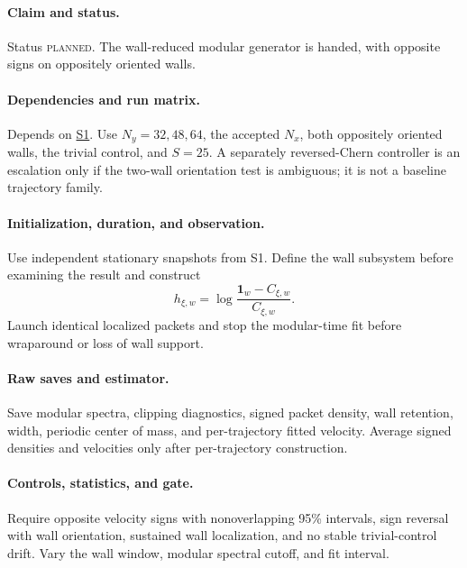 \documentclass[aps,prx,twocolumn,floatfix,nofootinbib,superscriptaddress,longbibliography]{revtex4-2}
\newcommand{\planned}{\textsc{planned}}
\newcommand{\campref}[1]{\hyperref[camp:#1]{#1}}
\begin{document}
\paragraph*{Claim and status.}
Status \planned.  The wall-reduced modular generator is handed, with opposite signs on
oppositely oriented walls.

\paragraph*{Dependencies and run matrix.}
Depends on \campref{S1}.  Use $N_y=32,48,64$, the accepted $N_x$, both oppositely oriented walls,
the trivial control, and $S=25$.  A separately reversed-Chern controller is an escalation
only if the two-wall
orientation test is ambiguous; it is not a baseline trajectory family.

\paragraph*{Initialization, duration, and observation.}
Use independent stationary snapshots from S1.  Define the wall subsystem before examining
the result and construct
\begin{equation}
 h_{\xi,w}=\log\frac{\mathbf{1}_w-C_{\xi,w}}{C_{\xi,w}}.
\end{equation}
Launch identical localized packets and stop the modular-time fit before wraparound or loss
of wall support.

\paragraph*{Raw saves and estimator.}
Save modular spectra, clipping diagnostics, signed packet density, wall retention, width,
periodic center of mass, and per-trajectory fitted velocity.  Average signed densities and
velocities only after per-trajectory construction.

\paragraph*{Controls, statistics, and gate.}
Require opposite velocity signs with nonoverlapping 95\% intervals, sign reversal with wall
orientation, sustained wall localization, and no stable trivial-control drift.  Vary the
wall window, modular spectral cutoff, and fit interval.
\end{document}
